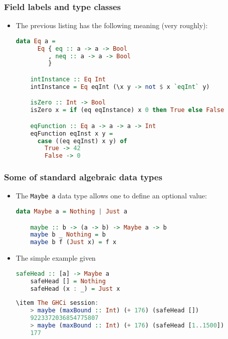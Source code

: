 \documentclass[10pt,pdf,utf8,russian,aspectratio=169]{beamer}
\begin{document}
\begin{frame}[fragile]
  \frametitle{Field labels and type classes}

  \begin{itemize}
    \item The previous listing has the following meaning (very roughly):
    \begin{lstlisting}[language=Haskell]
    data Eq a =
      Eq { eq :: a -> a -> Bool
         , neq :: a -> a -> Bool
         }

    intInstance :: Eq Int
    intInstance = Eq eqInt (\x y -> not $ x `eqInt` y)

    isZero :: Int -> Bool
    isZero x = if (eq eqInstance) x 0 then True else False

    eqFunction :: Eq a -> a -> a -> Int
    eqFunction eqInst x y =
      case ((eq eqInst) x y) of
        True -> 42
        False -> 0
    \end{lstlisting}
  \end{itemize}
\end{frame}

\begin{frame}[fragile]
  \frametitle{Some of standard algebraic data types}
  \begin{itemize}
    \item The \verb"Maybe a" data type allows one to define an optional value:
    \begin{lstlisting}[language=Haskell]
    data Maybe a = Nothing | Just a

    maybe :: b -> (a -> b) -> Maybe a -> b
    maybe b _ Nothing = b
    maybe b f (Just x) = f x
    \end{lstlisting}
    \item The simple example given
    \begin{lstlisting}[language=Haskell]
    safeHead :: [a] -> Maybe a
    safeHead [] = Nothing
    safeHead (x : _) = Just x
    \end{lstlisting}
    \begin{lstlisting}[language=Haskell]
    \item The GHCi session:
    > maybe (maxBound :: Int) (+ 176) (safeHead [])
    9223372036854775807
    > maybe (maxBound :: Int) (+ 176) (safeHead [1..1500])
    177
    \end{lstlisting}
  \end{itemize}
\end{frame}
\end{document}
